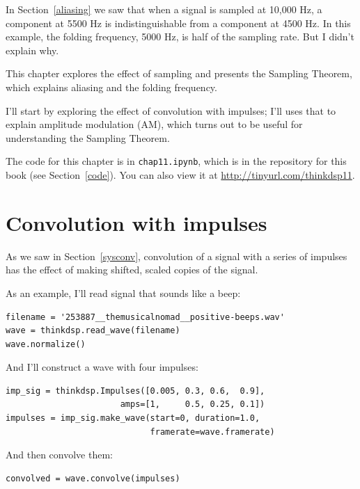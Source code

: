 \documentclass[12pt]{book}
\begin{document}
In Section~\ref{aliasing} we saw that when a signal is sampled at
10,000 Hz, a component at 5500 Hz is indistinguishable from a
component at 4500 Hz.  In this example, the folding frequency, 5000 Hz,
is half of the sampling rate.  But I didn't explain why.

This chapter explores the effect of sampling and presents the
Sampling Theorem, which explains aliasing and the folding frequency.

I'll start by exploring the effect of convolution with impulses;
I'll uses that to explain amplitude modulation (AM), which
turns out to be useful for understanding the Sampling Theorem.

The code for this chapter is in {\tt chap11.ipynb}, which is in the
repository for this book (see Section~\ref{code}).
You can also view it at \url{http://tinyurl.com/thinkdsp11}.


\section{Convolution with impulses}

As we saw in Section~\ref{sysconv}, convolution of a signal with
a series of impulses has the effect of making shifted, scaled
copies of the signal.

As an example, I'll read signal that sounds like a beep:

\begin{verbatim}
filename = '253887__themusicalnomad__positive-beeps.wav'
wave = thinkdsp.read_wave(filename)
wave.normalize()
\end{verbatim}

And I'll construct a wave with four impulses:

\begin{verbatim}
imp_sig = thinkdsp.Impulses([0.005, 0.3, 0.6,  0.9],
                       amps=[1,     0.5, 0.25, 0.1])
impulses = imp_sig.make_wave(start=0, duration=1.0,
                             framerate=wave.framerate)
\end{verbatim}

And then convolve them:

\begin{verbatim}
convolved = wave.convolve(impulses)
\end{verbatim}
\end{document}
